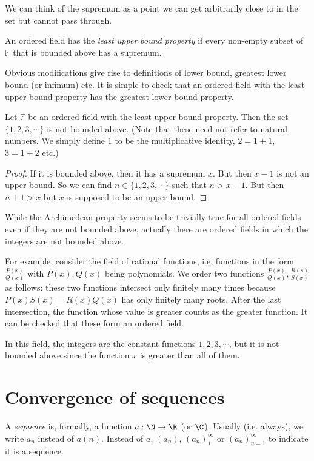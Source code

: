 \documentclass[a4paper]{article}
\begin{document}
We can think of the supremum as a point we can get arbitrarily close to in the set but cannot pass through.

\begin{defi}
  An ordered field has the \emph{least upper bound property} if every non-empty subset of $\mathbb{F}$ that is bounded above has a supremum.
\end{defi}

Obvious modifications give rise to definitions of lower bound, greatest lower bound (or infimum) etc. It is simple to check that an ordered field with the least upper bound property has the greatest lower bound property.

\begin{lemma}
  Let $\mathbb{F}$ be an ordered field with the least upper bound property. Then the set $\{1, 2, 3, \cdots\}$ is not bounded above. (Note that these need not refer to natural numbers. We simply define $1$ to be the multiplicative identity, $2 = 1 + 1$, $3 = 1 + 2$ etc.)
\end{lemma}

\begin{proof}
  If it is bounded above, then it has a supremum $x$. But then $x - 1$ is not an upper bound. So we can find $n\in \{1, 2, 3, \cdots\}$ such that $n> x - 1$. But then $n + 1 > x$ but $x$ is supposed to be an upper bound.
\end{proof}

While the Archimedean property seems to be trivially true for all ordered fields even if they are not bounded above, actually there are ordered fields in which the integers are not bounded above.

For example, consider the field of rational functions, i.e. functions in the form $\frac{P(x)}{Q(x)}$ with $P(x), Q(x)$ being polynomials. We order two functions $\frac{P(x)}{Q(x)}, \frac{R(s)}{S(x)}$ as follows: these two functions intersect only finitely many times because $P(x)S(x) = R(x)Q(x)$ has only finitely many roots. After the last intersection, the function whose value is greater counts as the greater function. It can be checked that these form an ordered field.

In this field, the integers are the constant functions $1, 2, 3, \cdots$, but it is not bounded above since the function $x$ is greater than all of them.

\section{Convergence of sequences}
\begin{defi}[Sequence]
  A \emph{sequence} is, formally, a function $a: \N \to \R$ (or $\C$). Usually (i.e. always), we write $a_n$ instead of $a(n)$. Instead of $a$, $(a_n)$, $(a_n)_1^\infty$ or $(a_n)_{n = 1}^\infty$ to indicate it is a sequence.
\end{defi}
\end{document}
